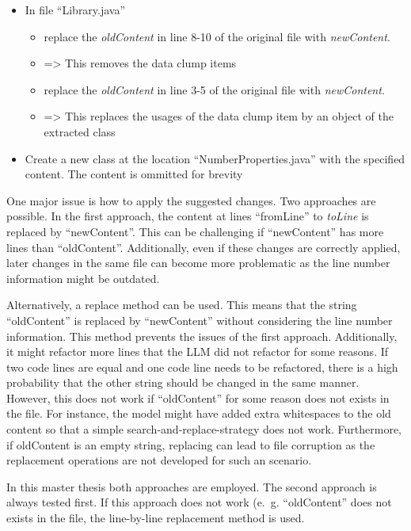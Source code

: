 \begin{itemize}
    \item In file \enquote{Library.java}
    \begin{itemize}
        \item replace the \textit{oldContent} in line 8-10 of the original file with \textit{newContent}.
        \item => This removes the data clump items
       \item replace the \textit{oldContent} in line 3-5 of the original file with \textit{newContent}.
        \item => This replaces the usages of the data clump item by an object of the extracted class 
    \end{itemize}
    \item Create a new class at the location \enquote{NumberProperties.java} with the specified content. The content is ommitted for brevity
\end{itemize}



One major issue is how to apply the suggested changes. Two approaches are possible.
In the first approach, the content at lines \enquote{fromLine} to \textit{toLine} is replaced by \enquote{newContent}. This can be challenging if \enquote{newContent} has more lines than \enquote{oldContent}. Additionally, even if these  changes are correctly applied, later changes in the same file can become more problematic as the line number information might be outdated. 

Alternatively, a replace method can be used. This means that the string \enquote{oldContent} is replaced by \enquote{newContent} without considering the line number information. This method prevents the issues of the first approach. Additionally, it might refactor more lines that the \ac{LLM} did not refactor for some reasons. If two code lines are equal and one code line needs to be refactored, there is a high probability that the other string should be changed in the same manner. However, this does not work if \enquote{oldContent} for some reason does not exists in the file. For instance, the model might have added extra whitespaces to the old content so that a simple search-and-replace-strategy does not work. Furthermore, if oldContent is an empty string, replacing can lead to file corruption as the replacement operations are not developed for such an scenario. 

In this master thesis both approaches are employed. The second approach is always tested first. If this approach does not work (e.~g. \enquote{oldContent} does not exists in the file, the line-by-line replacement method is used.  




